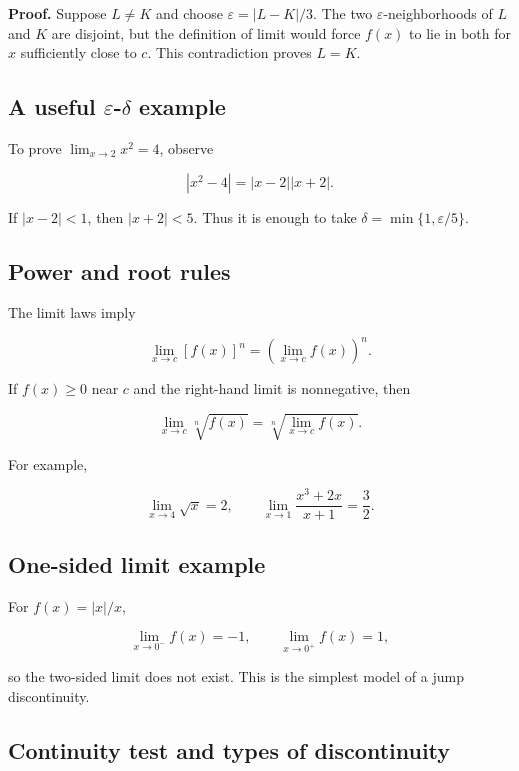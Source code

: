 \documentclass[11pt,a4paper]{article}
\begin{document}
\textbf{Proof.} Suppose \(L\ne K\) and choose \(\varepsilon=|L-K|/3\).
The two \(\varepsilon\)-neighborhoods of \(L\) and \(K\) are disjoint,
but the definition of limit would force \(f(x)\) to lie in both for
\(x\) sufficiently close to \(c\). This contradiction proves \(L=K\).

\subsection{\texorpdfstring{A useful \(\varepsilon\)-\(\delta\)
example}{A useful \textbackslash varepsilon-\textbackslash delta example}}\label{a-useful-varepsilon-delta-example}

To prove \(\lim_{x\to2}x^2=4\), observe

\[
|x^2-4|=|x-2||x+2|.
\]

If \(|x-2|<1\), then \(|x+2|<5\). Thus it is enough to take
\(\delta=\min\{1,\varepsilon/5\}\).

\subsection{Power and root rules}\label{power-and-root-rules}

The limit laws imply

\[
\lim_{x\to c}[f(x)]^n=\left(\lim_{x\to c}f(x)\right)^n.
\]

If \(f(x)\ge0\) near \(c\) and the right-hand limit is nonnegative, then

\[
\lim_{x\to c}\sqrt[n]{f(x)}=\sqrt[n]{\lim_{x\to c}f(x)}.
\]

For example,

\[
\lim_{x\to4}\sqrt{x}=2,
\qquad
\lim_{x\to1}\frac{x^3+2x}{x+1}=\frac32.
\]

\subsection{One-sided limit example}\label{one-sided-limit-example}

For \(f(x)=|x|/x\),

\[
\lim_{x\to0^-}f(x)=-1,\qquad \lim_{x\to0^+}f(x)=1,
\]

so the two-sided limit does not exist. This is the simplest model of a
jump discontinuity.

\subsection{Continuity test and types of
discontinuity}\label{continuity-test-and-types-of-discontinuity}
\end{document}
